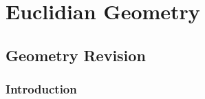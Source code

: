          \chapter{Euclidian Geometry}
    \setcounter{figure}{1}
    \setcounter{subfigure}{1}
    \label{84e7e983e7dc2060d6909eddb5375c22}
    
          \section{Geometry Revision}
    \setcounter{figure}{1}
    \setcounter{subfigure}{1}
    \label{8eb3a75df362978731c03bbeab266515}
    
    
    
    
       
%     
%     
%     
    
    
    
  
    
    \label{m39370*cid2}
            \subsection{ Introduction}
            \nopagebreak
            

